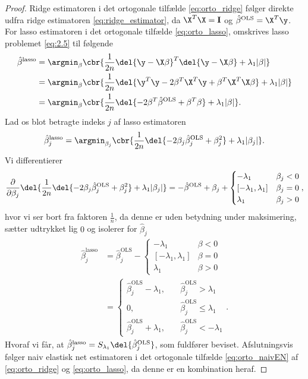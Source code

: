 \begin{proof}
Ridge estimatoren i det ortogonale tilfælde \eqref{eq:orto_ridge} følger direkte udfra ridge estimatoren \eqref{eq:ridge_estimator}, da \(\X^T \X = \mathbf{I}\) og \(\hat{\beta}^\text{OLS} = \X^T \y\).
For lasso estimatoren i det ortogonale tilfælde \eqref{eq:orto_lasso}, omskrives lasso problemet \eqref{eq:2.5} til følgende
\begin{align*}
\hat{\beta}^\text{lasso} &= \argmin_{\beta} \cbr{\frac{1}{2n} \del{\y - \X \beta}^T \del{\y - \X \beta} + \lambda_1 \vert \beta \vert} \\
&= \argmin_{\beta} \cbr{\frac{1}{2n} \del{\y^T \y - 2 \beta^T \X^T \y + \beta^T \X^T \X \beta} + \lambda_1 \vert \beta \vert} \\
&= \argmin_{\beta} \cbr{\frac{1}{2n} \del{ - 2 \beta^T \hat{\beta}^\text{OLS} + \beta^T \beta} + \lambda_1 \vert \beta \vert}.
\end{align*}
Lad os blot betragte indeks \(j\) af lasso estimatoren
\begin{align*}
\hat{\beta}_j^\text{lasso} = \argmin_{\beta_j} \cbr{\frac{1}{2n} \del{ - 2 \beta_j \hat{\beta}_j^\text{OLS} + \beta_j^2} + \lambda_1 \vert \beta_j \vert}.
\end{align*}
Vi differentierer
\begin{align*}
\frac{\partial}{\partial \beta_j} \del{\frac{1}{2n} \del{ - 2 \beta_j \hat{\beta}_j^\text{OLS} + \beta_j^2} + \lambda_1 \vert \beta_j \vert}
=-\hat{\beta}^\text{OLS} + \beta_j + \begin{cases}
-\lambda_1 \quad &\beta_j < 0 \\
[-\lambda_1, \lambda_1] & \beta_j = 0 \\
\lambda_1 & \beta_j >0 
\end{cases},
\end{align*}
hvor vi ser bort fra faktoren \(\frac{1}{n}\), da denne er uden betydning under maksimering, sætter udtrykket lig \(0\) og isolerer for \(\hat{\beta}_j\)
\begin{align*}
\hat{\beta}_j^\text{lasso} &= \hat{\beta}_j^\text{OLS} - \begin{cases}
-\lambda_1 \quad &\beta < 0 \\
[-\lambda_1, \lambda_1] & \beta = 0 \\
\lambda_1 & \beta >0 
\end{cases} \\
&= \begin{cases}
\hat{\beta}_j^\text{OLS} - \lambda_1, \quad &\hat{\beta}_j^\text{OLS} > \lambda_1 \\
0, &\hat{\beta}_j^\text{OLS} \leq \lambda_1 \\
\hat{\beta}_j^\text{OLS} + \lambda_1, \quad &\hat{\beta}_j^\text{OLS} < - \lambda_1
\end{cases}. 
\end{align*}
Hvoraf vi får, at \(\hat{\beta}_j^\text{lasso} = S_{\lambda_1} \del{ \hat{\beta}_j^\text{OLS}} \), som fuldfører beviset.
Afslutningsvis følger naiv elastisk net estimatoren i det ortogonale tilfælde \eqref{eq:orto_naivEN} af \eqref{eq:orto_ridge} og \eqref{eq:orto_lasso}, da denne er en kombination heraf.
\end{proof}
